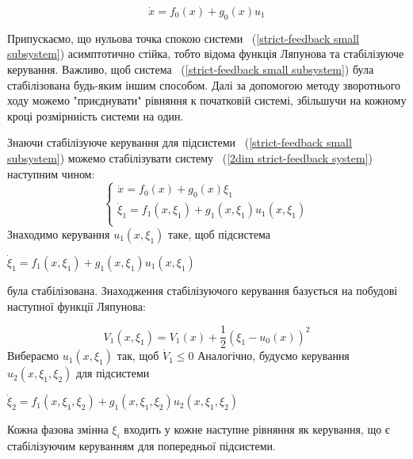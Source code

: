 \documentclass{article}
\begin{document}
\begin{equation} \label{strict-feedback small subsystem}
\dot x = f_0(x)+g_0(x)u_1
\end{equation}

Припускаємо, що нульова точка спокою системи ~(\ref{strict-feedback small subsystem}) 
асимптотично стійка, тобто відома функція Ляпунова
та стабілізуюче керування. Важливо, щоб система ~(\ref{strict-feedback small subsystem}) була стабілізована будь-яким іншим способом.
Далі за допомогою методу зворотнього ходу можемо "приєднувати" рівняння к початковій системі, 
збільшучи на кожному кроці розмірниість системи на один. 

Знаючи стабілізуюче керування для підсистеми  ~(\ref{strict-feedback small subsystem})
можемо стабілізувати систему ~(\ref{2dim strict-feedback system}) наступним чином:
\begin{equation} \label{2dim strict-feedback system}
    \begin{cases}
    \dot x = f_0(x)+g_0(x)\xi_1\\
    \dot \xi_1 = f_1(x,\xi_1)+g_1(x,\xi_1)u_1(x,\xi_1)\\
    \end{cases}
\end{equation}
Знаходимо керування $u_1(x,\xi_1)$ таке, щоб підсистема

$\dot \xi_1 = f_1(x,\xi_1)+g_1(x,\xi_1)u_1(x,\xi_1)$

була стабілізована. Знаходження стабілізуючого керування базується на побудові наступної функції Ляпунова:

\begin{equation}
V_{1}(x,\xi_1)=V_{1}(x)+{\frac{1}{2}}(\xi_1-u_{0}(x))^{2}
\end{equation}
Вибераємо $u_1(x,\xi_1)$ так, щоб $\dot V_{1} \le 0$
Аналогічно, будуємо керування $u_{2}(x,\xi_{1},\xi_{2})$ для підсистеми  

$\dot \xi_2 = f_1(x,\xi_1,\xi_2)+g_1(x, \xi_1, \xi_2)u_2(x,\xi_1, \xi_2)$



Кожна фазова змінна $\xi_i$ входить у кожне наступне рівняння як керування, що є стабілізуючим
керуванням для попередньої підсистеми. 






\pagebreak
\end{document}
